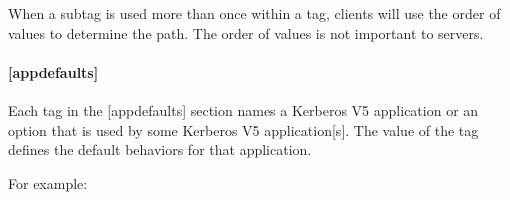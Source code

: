\documentclass[letterpaper,10pt,english]{sphinxmanual}
\begin{document}
%
\begin{sphinxVerbatim}[commandchars=\\\{\}]
\PYG{p}{[}\PYG{p}{]}
      
          
          
          
          
          
      
          
      
          
      
          
      
          
          
\end{sphinxVerbatim}

When a subtag is used more than once within a tag, clients will use
the order of values to determine the path.  The order of values is not
important to servers.


\paragraph{{[}appdefaults{]}}
\label{\detokenize{admin/conf_files/krb5_conf:id5}}\label{\detokenize{admin/conf_files/krb5_conf:appdefaults}}
Each tag in the {[}appdefaults{]} section names a Kerberos V5 application
or an option that is used by some Kerberos V5 application{[}s{]}.  The
value of the tag defines the default behaviors for that application.

For example:
\end{document}
